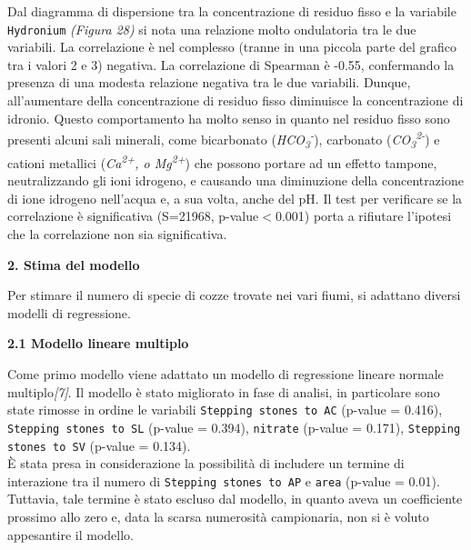 \documentclass{article} %
\begin{document}
Dal diagramma di dispersione tra la concentrazione di residuo fisso e la variabile \texttt{Hydronium} \textit{(Figura 28)} si nota una relazione molto ondulatoria tra le due variabili.
La correlazione è nel complesso (tranne in una piccola parte del grafico tra i valori 2 e 3) negativa.
La correlazione di Spearman è -0.55, confermando la presenza di una modesta relazione negativa tra le due variabili. Dunque, all'aumentare della concentrazione di residuo fisso diminuisce la concentrazione di idronio.
Questo comportamento ha molto senso in quanto nel residuo fisso sono presenti alcuni sali minerali, come bicarbonato (\textit{HCO\textsubscript{3}\textsuperscript{-}}), carbonato (\textit{CO\textsubscript{3}\textsuperscript{2-}}) e cationi metallici (\textit{Ca\textsuperscript{2+}, o Mg\textsuperscript{2+}}) che possono portare ad un effetto tampone, neutralizzando gli ioni idrogeno, e causando una diminuzione della concentrazione di ione idrogeno nell'acqua e, a sua volta, anche del pH.
Il test per verificare se la correlazione è significativa (S=21968, p-value$<$0.001) porta a rifiutare l'ipotesi che la correlazione non sia significativa.

\newpage
\begin{flushleft}
    \textbf{\Huge 2. \: Stima del modello}
    \vskip 10pt
\end{flushleft}

Per stimare il numero di specie di cozze trovate nei vari fiumi, si adattano diversi modelli di regressione.

\vskip 20pt
\begin{flushleft}
    \textbf{\Large 2.1 \: Modello lineare multiplo}
\end{flushleft}
\vskip 10pt

Come primo modello viene adattato un modello di regressione lineare normale multiplo\textit{[7]}. Il modello è stato migliorato in fase di analisi, in particolare sono state rimosse in ordine le variabili \texttt{Stepping stones to AC} (p-value = 0.416), \texttt{Stepping stones to SL} (p-value = 0.394), \texttt{nitrate} (p-value = 0.171),   \texttt{Stepping stones to SV} (p-value = 0.134). \\
È stata presa in considerazione la possibilità di includere un termine di interazione tra il numero di \texttt{Stepping stones to AP} e \texttt{area} (p-value = 0.01). Tuttavia, tale termine è stato escluso dal modello, in quanto aveva un coefficiente prossimo allo zero e, data la scarsa numerosità campionaria, non si è voluto appesantire il modello.
\end{document}
